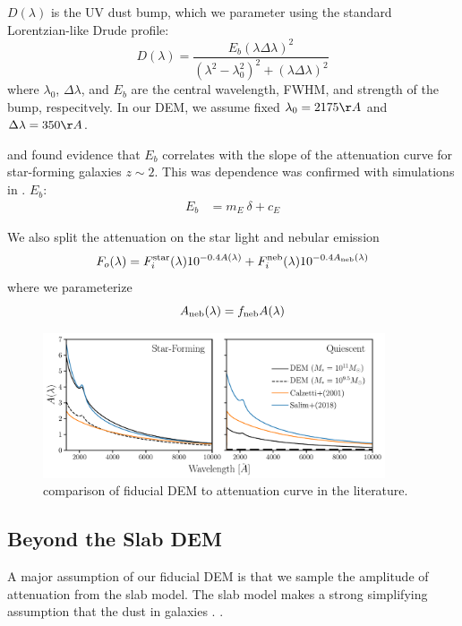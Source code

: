 $D(\lambda)$ is the UV dust bump, which we
parameter using the standard Lorentzian-like Drude profile:
\begin{equation}
    D(\lambda) = \frac{E_b(\lambda \Delta \lambda)^2}{(\lambda^2 -
    \lambda_0^2)^2 + (\lambda \Delta \lambda)^2}
\end{equation}
where $\lambda_0$, $\Delta \lambda$, and $E_b$ are the central wavelength,
FWHM, and strength of the bump, respecitvely. In our DEM, we assume fixed 
$\lambda_0 = 2175 \AA$ and $\Delta \lambda = 350\AA$. 

\cite{kriek2013} and \cite{tress2018} found evidence that $E_b$ correlates with
the slope of the attenuation curve for star-forming galaxies $z\sim2$. This was
dependence was confirmed with simulations in \cite{naranyanan2018}. $E_b$: 
\begin{align}
    E_b &= m_E~\delta + c_E
\end{align}

We also split the attenuation on the star light and nebular emission 
\begin{equation} 
    F_o (\lambda) = F^{\rm star}_i (\lambda) 10^{-0.4 A(\lambda)} + F^{\rm
    neb}_i (\lambda) 10^{-0.4 A_{\rm neb}(\lambda)}
\end{equation}
where we parameterize
\begin{equation}
    A_{\rm neb}(\lambda) = f_{\rm neb}  A(\lambda) 
\end{equation} 


\begin{figure}
\begin{center}
    \includegraphics[width=0.9\textwidth]{figs/dems.pdf}
    \caption{comparison of fiducial DEM to attenuation curve in the literature.}
\label{fig:dem}
\end{center}
\end{figure}


\subsection{Beyond the Slab DEM}  \label{sec:nonslab} 
A major assumption of our fiducial DEM is that we sample the amplitude of
attenuation from the slab model. The slab model makes a strong simplifying 
assumption that the dust in galaxies . . 

